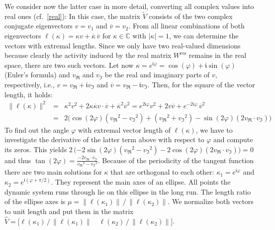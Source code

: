 \documentclass[twoside,11pt]{article}
\theoremstyle{definition}
\begin{document}
We consider now the latter case in more detail, converting all complex values
into real ones (cf.~\cref{real}): In this case, the matrix
$\tilde{V}$ consists of the two complex conjugate eigenvectors $v = v_1$ and
$\overline{v} = v_2$. From all linear combinations of both eigenvectors $\ell(\kappa)
= \kappa v + \overline{\kappa}\,\overline{v}$ for $\kappa \in \mathbb{C}$ with $|\kappa| =
1$, we can determine the vectors with extremal lengths. Since we only have two
real-valued dimensions because clearly the activity induced by the real
matrix $W^\mathrm{res}$ remains in the real space, there are two such vectors.
Let now $\kappa = e^{\mathfrak{i} \varphi} = \cos(\varphi) + \mathfrak{i}
\sin(\varphi)$ (Euler's formula) and $v_\Re$ and $v_\Im$ be the real and
imaginary parts of $v$, respectively, i.e., $v = v_\Re+\mathfrak{i} v_\Im$ and
$\overline{v} = v_\Re-\mathfrak{i} v_\Im$. Then, for the square of the vector
length, it holds:
\begin{eqnarray*}
\|\ell(\kappa)\|^2
& = & \kappa^2 v^2 + 2 \kappa \overline{\kappa} v\!\cdot\!\overline{v} + \overline{\kappa}^2 \overline{v}^2
= e^{2 \mathfrak{i} \varphi} v^2 + 2 v \overline{v} + e^{-2 \mathfrak{i} \varphi}\,\overline{v}^2\\[3pt]
& = & 2 \big(\!\cos(2\varphi) ({v_\Re}^2\!-\!{v_\Im}^2) + ({v_\Re}^2\!+\!{v_\Im}^2) - \sin(2\varphi) (2 v_\Re\!\cdot\!v_\Im) \big)
\end{eqnarray*}
To find out the angle $\varphi$ with extremal vector length of $\ell(\kappa)$,
we have to investigate the derivative of the latter term above with respect to
$\varphi$ and compute its zeros. This yields $2\,\big(\mathrm{-}2 \sin(2\varphi)
({v_\Re}^2\!-\!{v_\Im}^2) - 2\cos(2\varphi) (2 v_\Re\!\cdot\!v_\Im) \big) = 0$
and thus $\tan(2\varphi) = \frac{-2 v_\Re \cdot v_\Im}{{v_\Re}^2-{v_\Im}^2}$.
Because of the periodicity of the tangent function there are two main solutions
for $\kappa$ that are orthogonal to each other: $\kappa_1 = e^{\mathfrak{i}\varphi}$ and
$\kappa_2 = e^{\mathfrak{i}(\varphi+\pi/2)}$. They represent the main axes of an ellipse.
All points the dynamic system runs through lie on this ellipse in the long run.
The length ratio of the ellipse axes is $\mu = \|\ell(\kappa_1)\| \,/\,
\|\ell(\kappa_2)\|$. We normalize both vectors to unit length and put them in
the matrix $\hat{V} = \big[ \ell(\kappa_1) \,/\, \|\ell(\kappa_1)\| \quad
\ell(\kappa_2) \,/\, \|\ell(\kappa_2)\| \big]$.
\end{document}
